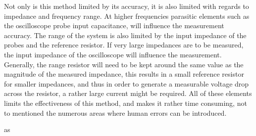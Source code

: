 Not only is this method limited by its accuracy, it is also limited with regards to impedance and frequency range. At higher frequencies parasitic elements such as the oscilloscope probe input capacitance, will influence the measurement accuracy. The range of the system is also limited by the input impedance of the probes and the reference resistor. If very large impedances are to be measured, the input impedance of the oscilloscope will influence the measurement. Generally, the range resistor will need to be kept around  the same value as the magnitude of the measured impedance, this results in a small reference resistor for smaller impedances, and thus in order to generate a measurable voltage drop across the resistor, a rather large current might be required. All of these elements limits the effectiveness of this method, and makes it rather time consuming, not to mentioned the numerous areas where human errors can be introduced.

as
